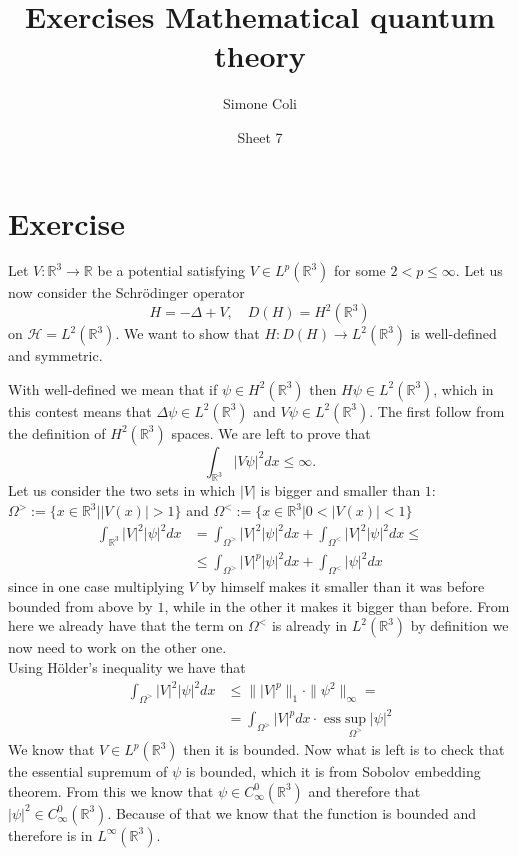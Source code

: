 \documentclass{article}
\title{Exercises \- Mathematical quantum theory}
\author{Simone Coli \- 6771371}
\date{Sheet 7}
\newcommand{\R}{\mathbb{R}}
\begin{document}
\maketitle

\section{Exercise}
Let $ V: \R^3 \to \R$ be a potential satisfying $V \in L^p(\R^3)$ for some $2<p\leq \infty$. Let us now consider the Schrödinger operator
\[
    H = -\Delta + V, \quad D(H) = H^2 (\R^3)
\]
on $\mathcal{H} = L^2(\R^3)$. We want to show that $H: D(H) \to L^2 (\R^3)$ is well-defined and symmetric.

With well-defined we mean that if $\psi \in H^2(\R^3)$ then $H\psi \in L^2(\R^3)$, which in this contest means that $\Delta \psi \in L^2(\R^3)$ and $V \psi \in L^2(\R^3)$. The first follow from the definition of $H^2(\R^3)$ spaces. We are left to prove that 
\[
    \int_{\R^3} |V \psi|^2 dx \leq \infty.
\]
Let us consider the two sets in which $|V|$ is bigger and smaller than $1$: $\Omega^> := \{ x \in \R^3 | |V(x)| > 1 \}$ and $\Omega^< := \{ x \in \R^3 | 0< |V(x)| < 1 \}$
\[
    \begin{split}
        \int_{\R^3} |V|^2 |\psi|^2 dx &= \int_{\Omega^>} |V|^2 |\psi|^2 dx + \int_{\Omega^<} |V|^2 |\psi|^2 dx \leq\\
        & \leq \int_{\Omega^>} |V|^p |\psi|^2 dx + \int_{\Omega^<} |\psi|^2 dx
    \end{split}
\]
since in one case multiplying $V$ by himself makes it smaller than it was before bounded from above by $1$, while in the other it makes it bigger than before. From here we already have that the term on $\Omega^<$ is already in $L^2(\R^3)$ by definition we now need to work on the other one.\\
Using Hölder's inequality we have that
\[
    \begin{split}
        \int_{\Omega^>} |V|^2 |\psi|^2 dx & \leq  \| |V|^p \|_1 \cdot \| \psi^2 \|_\infty = \\
        & = \int_{\Omega^>} |V|^p dx \cdot \mbox{ ess} \sup_{\Omega^>}{|\psi|^2}
    \end{split}
\]
We know that $V \in L^p(\R^3)$ then it is bounded. Now what is left is to check that the essential supremum of $\psi$ is bounded, which it is from Sobolov embedding theorem. From this we know that $\psi \in C^0_\infty(\R^3)$ and therefore that $|\psi|^2 \in C^0_\infty (\R^3)$. Because of that we know that the function is bounded and therefore is in $L^\infty (\R^3)$.
\end{document}
